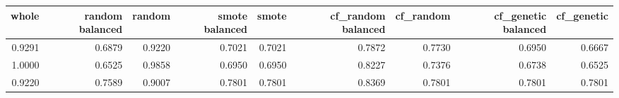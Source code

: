 \begin{tabular}{rrrrrrrrr}
\toprule

 whole &  random balanced &  random &  smote balanced &  smote &  cf\_random balanced &  cf\_random &  cf\_genetic balanced &  cf\_genetic \\
\midrule

0.9291 &           0.6879 &  0.9220 &          0.7021 & 0.7021 &              0.7872 &     0.7730 &               0.6950 &      0.6667 \\
1.0000 &           0.6525 &  0.9858 &          0.6950 & 0.6950 &              0.8227 &     0.7376 &               0.6738 &      0.6525 \\
0.9220 &           0.7589 &  0.9007 &          0.7801 & 0.7801 &              0.8369 &     0.7801 &               0.7801 &      0.7801 \\

\bottomrule
\end{tabular}
